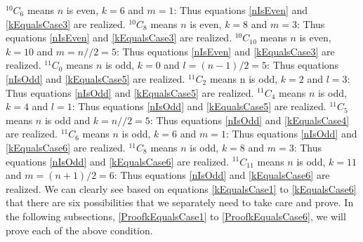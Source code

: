\documentclass[12pt, twoside]{article}
\newcommand*{\Combination}[2]{{}^{#1}C_{#2}}%
\begin{document}
$\Combination{10}{6}$ means $n$ is even, $k = 6$ and $m=1$: Thus equations \eqref{nIsEven} and \eqref{kEqualsCase3} are realized.\newline
$\Combination{10}{8}$ means $n$ is even, $k = 8$ and $m=3$: Thus equations \eqref{nIsEven} and \eqref{kEqualsCase3} are realized.\newline
$\Combination{10}{10}$ means $n$ is even, $k = 10$ and $m= n//2=5$: Thus equations \eqref{nIsEven} and \eqref{kEqualsCase3} are realized.\newline\newline
$\Combination{11}{0}$ means $n$ is odd, $k = 0$ and $l=(n-1)/2=5$: Thus equations \eqref{nIsOdd} and \eqref{kEqualsCase5} are realized.\newline
$\Combination{11}{2}$ means n is odd, $k = 2$ and $l=3$: Thus equations \eqref{nIsOdd} and \eqref{kEqualsCase5} are realized.\newline
$\Combination{11}{4}$ means $n$ is odd, $k = 4$ and $l=1$: Thus equations \eqref{nIsOdd} and \eqref{kEqualsCase5} are realized.\newline\newline
$\Combination{11}{5}$ means $n$ is odd and $k = n//2 = 5$: Thus equations \eqref{nIsOdd} and \eqref{kEqualsCase4} are realized.\newline\newline
$\Combination{11}{6}$ means $n$ is odd, $k = 6$ and $m=1$: Thus equations \eqref{nIsOdd} and \eqref{kEqualsCase6} are realized.\newline
$\Combination{11}{8}$ means $n$ is odd, $k = 8$ and $m=3$: Thus equations \eqref{nIsOdd} and \eqref{kEqualsCase6} are realized.\newline
$\Combination{11}{11}$ means $n$ is odd, $k = 11$ and $m= (n+1)/2=6$: Thus equations \eqref{nIsOdd} and \eqref{kEqualsCase6} are realized.\newline\newline
We can clearly see based on equations \eqref{kEqualsCase1} to \eqref{kEqualsCase6} that there are six possibilities that we separately need to take care and prove. In the following subsections, \ref{ProofkEqualsCase1} to \ref{ProofkEqualsCase6}, we will prove each of the above condition.
\end{document}
